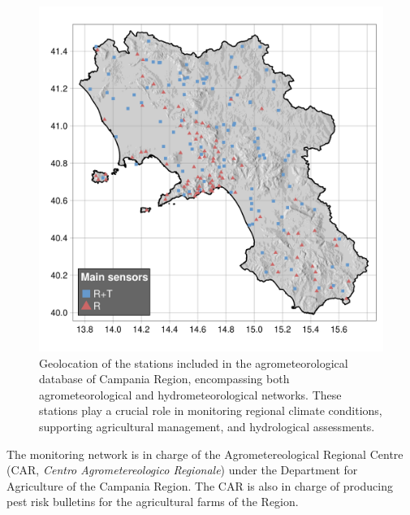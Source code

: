 \documentclass[authoryear,preprint,review,12pt]{elsarticle}
\begin{document}
\begin{figure}
	\centering
    \includegraphics[scale=0.6]{figures/map_stations.png}
	\caption{ Geolocation of the stations included in the agrometeorological database of Campania Region, %
    encompassing both agrometeorological and hydrometeorological networks. These stations play a crucial role in monitoring regional climate conditions, supporting agricultural management, and hydrological assessments.
    }
	\label{fig:rarLocations}
\end{figure}

The monitoring network is in charge of the Agrometereological Regional Centre (CAR, \emph{Centro Agrometereologico Regionale}) under the Department for Agriculture of the Campania Region. The CAR is also in charge of producing pest risk bulletins for the agricultural farms of the Region.
\end{document}
